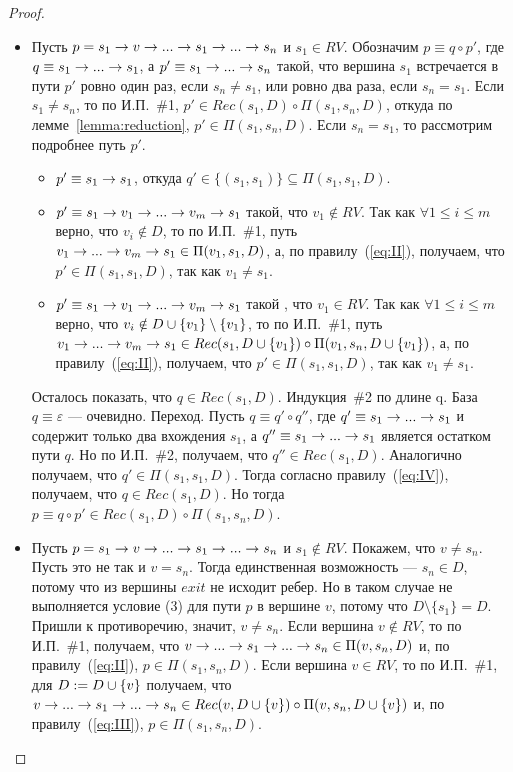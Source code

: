 \begin{proof}
\begin{itemize}
    \item Пусть $p = s_1 \rightarrow v \rightarrow ... \rightarrow s_1 \rightarrow ... \rightarrow s_n$ и $s_1 \in RV$.
          Обозначим $p \equiv q \circ p'$, где $q \equiv s_1 \rightarrow ... \rightarrow s_1$, а
          $p' \equiv s_1 \rightarrow ... \rightarrow s_n$ такой, что вершина $s_1$ встречается в пути $p'$ ровно один раз, если $s_n \neq s_1$, или ровно два раза, если $s_n = s_1$. Если $s_1 \neq s_n$, то по И.П.~\#1, $p' \in Rec(s_1,D) \circ \Pi(s_1,s_n,D)$, откуда по лемме~\ref{lemma:reduction},
          $p' \in \Pi(s_1,s_n,D)$. Если $s_n = s_1$, то рассмотрим подробнее путь $p'$.
          \begin{itemize}
            \item $p' \equiv s_1 \rightarrow s_1$, откуда $q' \in \{(s_1,s_1)\} \subseteq \Pi(s_1,s_1,D)$.
            \item $p' \equiv s_1 \rightarrow v_1 \rightarrow ... \rightarrow v_m \rightarrow s_1$ такой, что $v_1 \notin RV$.
                  Так как $\forall 1 \leq i \leq m$ верно, что $v_i \notin D$, то 
                  по И.П.~\#1, путь $v_1 \rightarrow ... \rightarrow v_m \rightarrow s_1 \in \Pi(v_1, s_1, D)$, а, по правилу~(\ref{eq:II}), получаем, что
                  $p' \in \Pi(s_1,s_1,D)$, так как $v_1 \neq s_1$.
            \item $p' \equiv s_1 \rightarrow v_1 \rightarrow ... \rightarrow v_m \rightarrow s_1$ такой , что $v_1 \in RV$.
                Так как $\forall 1 \leq i \leq m$ верно, что $v_i \notin D \cup \{v_1\} \setminus \{v_1\}$, то 
                по И.П.~\#1, путь $v_1 \rightarrow ... \rightarrow v_m \rightarrow s_1 \in Rec(s_1,D \cup \{v_1\}) \circ \Pi(v_1,s_n,D \cup \{v_1\})$,
                а, по правилу~(\ref{eq:II}), получаем, что $p' \in \Pi(s_1,s_1,D)$, так как $v_1 \neq s_1$.
        \end{itemize}
        Осталось показать, что $q \in Rec(s_1,D)$.
        Индукция~\#2 по длине q. База $q \equiv \varepsilon$ --- очевидно.
        Переход. Пусть $q \equiv q' \circ q''$, где $q' \equiv s_1 \rightarrow ... \rightarrow s_1$ и содержит только два вхождения $s_1$, 
        а $q'' \equiv s_1 \rightarrow ... \rightarrow s_1$ является остатком пути $q$.
        Но по И.П.~\#2, получаем, что $q'' \in Rec(s_1, D)$. 
        Аналогично получаем, что $q' \in \Pi(s_1,s_1,D)$. Тогда согласно правилу~(\ref{eq:IV}), получаем, что $q \in Rec(s_1,D)$.
        Но тогда $p \equiv q \circ p' \in Rec(s_1,D) \circ \Pi(s_1,s_n,D)$.
    \item Пусть $p = s_1 \rightarrow v \rightarrow ... \rightarrow s_1 \rightarrow ... \rightarrow s_n$ и $s_1 \notin RV$. Покажем, что $v \neq s_n$.
    Пусть это не так и $v = s_n$. Тогда единственная возможность --- $s_n \in D$, потому что из вершины $exit$ не исходит ребер.
    Но в таком случае не выполняется условие (3) для пути $p$ в вершине $v$, потому что $D \setminus \{s_1\} = D$. Пришли к противоречию, значит, $v \neq s_n$.
        Если вершина $v \notin RV$, то по И.П.~\#1, получаем, что $v \rightarrow ... \rightarrow s_1 \rightarrow ... \rightarrow s_n \in \Pi(v,s_n,D)$ и, по правилу~(\ref{eq:II}),
        $p \in \Pi(s_1, s_n, D)$.
        Если вершина $v \in RV$, то по И.П.~\#1, для $D := D \cup \{v\}$ получаем, что $v \rightarrow ... \rightarrow s_1 \rightarrow ... \rightarrow s_n \in Rec(v, D \cup \{v\}) \circ \Pi(v,s_n,D \cup \{v\})$ и, по правилу~(\ref{eq:III}), $p \in \Pi(s_1,s_n,D)$.
\end{itemize}
\end{proof}

